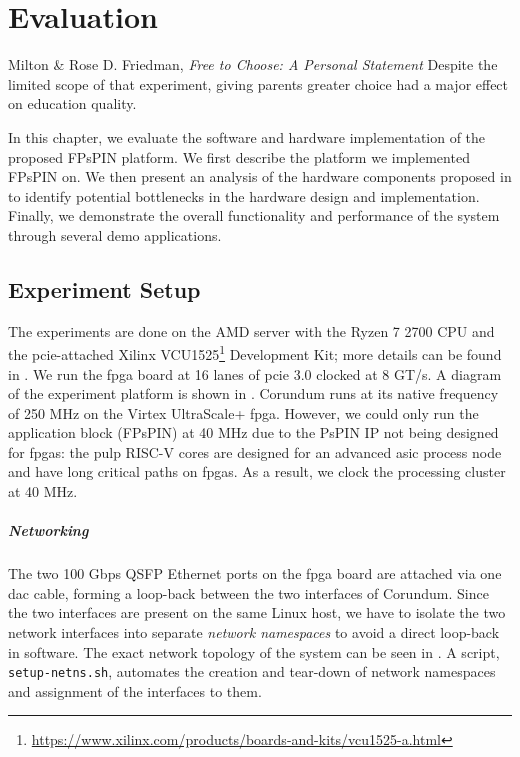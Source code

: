 \chapter{Evaluation} \label{chap:eval}
\begin{chapquote}{Milton \& Rose D. Friedman, \textit{Free to Choose: A Personal Statement}}
Despite the limited scope of that experiment, giving parents greater choice had a major effect on education quality.
\end{chapquote}


In this chapter, we evaluate the software and hardware implementation of the proposed FPsPIN platform.  We first describe the platform we implemented FPsPIN on.  We then present an analysis of the hardware components proposed in  to identify potential bottlenecks in the hardware design and implementation.  Finally, we demonstrate the overall functionality and performance of the system through several demo applications.

\section{Experiment Setup} \label{sec:eval-setup}

The experiments are done on the AMD server with the Ryzen 7 2700 CPU and the \ac{pcie}-attached Xilinx VCU1525\footnote{\url{https://www.xilinx.com/products/boards-and-kits/vcu1525-a.html}} Development Kit; more details can be found in .  We run the \ac{fpga} board at 16 lanes of \ac{pcie} 3.0 clocked at 8 GT/s.  A diagram of the experiment platform is shown in .  Corundum runs at its native frequency of 250 MHz on the Virtex UltraScale+ \ac{fpga}.  However, we could only run the application block (FPsPIN) at 40 MHz due to the PsPIN IP not being designed for \ac{fpga}s: the \ac{pulp} RISC-V cores are designed for an advanced \ac{asic} process node and have long critical paths on \ac{fpga}s.  As a result, we clock the processing cluster at 40 MHz.

\paragraph{Networking} The two 100 Gbps QSFP Ethernet ports on the \ac{fpga} board are attached via one \ac{dac} cable, forming a loop-back between the two interfaces of Corundum.  Since the two interfaces are present on the same Linux host, we have to isolate the two network interfaces into separate \emph{network namespaces} to avoid a direct loop-back in software.  The exact network topology of the system can be seen in .  A script, \texttt{setup-netns.sh}, automates the creation and tear-down of network namespaces and assignment of the interfaces to them.

